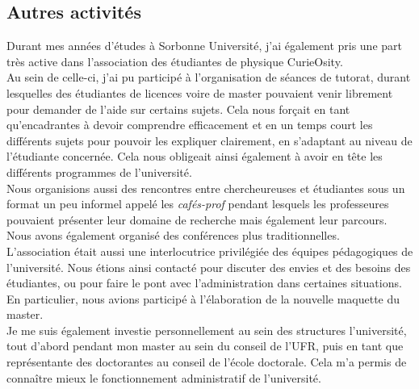 \documentclass[a4paper,11pt]{article} %
\newcommand{\pointmedian}{\fontfamily{cmr}\selectfont\textperiodcentered}
\begin{document}
	\subsection{Autres activités}
	Durant mes années d'études à Sorbonne Université, j'ai également pris une part très active dans l'association des étudiant\pointmedian es de physique CurieOsity.\\ 
	Au sein de celle-ci, j'ai pu participé à l'organisation de séances de tutorat, durant lesquelles des étudiant\pointmedian es de licences voire de master pouvaient venir librement pour demander de l'aide sur certains sujets. Cela nous forçait en tant qu'encadrant\pointmedian es à devoir comprendre efficacement et en un temps court les différents sujets pour pouvoir les expliquer clairement, en s'adaptant au niveau de l'étudiant\pointmedian e concerné\pointmedian e. Cela nous obligeait ainsi également à avoir en tête les différents programmes de l'université.\\
	Nous organisions aussi des rencontres entre chercheur\pointmedian euses et étudiant\pointmedian es sous un format un peu informel appelé les \textit{cafés-prof} pendant lesquels les professeur\pointmedian es pouvaient présenter leur domaine de recherche mais également leur parcours. Nous avons également organisé des conférences plus traditionnelles.\\
	L'association était aussi une interlocutrice privilégiée des équipes pédagogiques de l'université. Nous étions ainsi contacté pour discuter des envies et des besoins des étudiant\pointmedian es, ou pour faire le pont avec l'administration dans certaines situations. En particulier, nous avions participé à l'élaboration de la nouvelle maquette du master.\\
	
	Je me suis également investie personnellement au sein des structures l'université, tout d'abord pendant mon master au sein du conseil de l'UFR, puis en tant que représentante des doctorant\pointmedian es au conseil de l'école doctorale. Cela m'a permis de connaître mieux le fonctionnement administratif de l'université.
	
	
\end{document}
